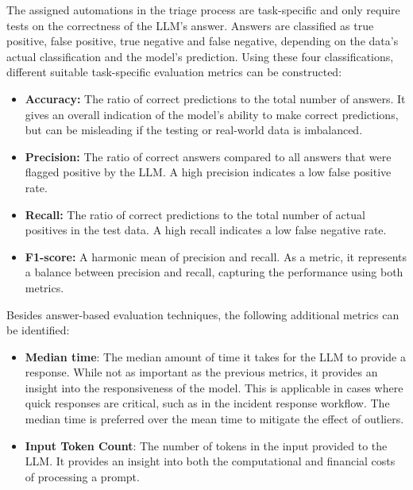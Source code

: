 The assigned automations in the triage process are task-specific and only require tests on the correctness of the LLM's
answer.
Answers are classified as true positive, false positive, true negative and false negative, depending on the data's
actual classification and the model's prediction.
Using these four classifications, different suitable task-specific evaluation metrics can be constructed:
\begin{itemize}
    \item \textbf{Accuracy:} The ratio of correct predictions to the total number of answers.
    It gives an overall indication of the model's ability to make correct predictions, but can be misleading if the
    testing or real-world data is imbalanced.

    \item \textbf{Precision:} The ratio of correct answers compared to all answers that were flagged positive by the
    LLM\@.
    A high precision indicates a low false positive rate.

    \item \textbf{Recall:} The ratio of correct predictions to the total number of actual positives in the test data.
    A high recall indicates a low false negative rate.

    \item \textbf{F1-score:} A harmonic mean of precision and recall.
    As a metric, it represents a balance between precision and recall, capturing the performance using both metrics.
\end{itemize}

Besides answer-based evaluation techniques, the following additional metrics can be identified:
\begin{itemize}
    \item \textbf{Median time}: The median amount of time it takes for the LLM to provide a response.
    While not as important as the previous metrics, it provides an insight into the responsiveness of the model.
    This is applicable in cases where quick responses are critical, such as in the incident response workflow.
    The median time is preferred over the mean time to mitigate the effect of outliers.

    \item \textbf{Input Token Count}: The number of tokens in the input provided to the LLM\@.
    It provides an insight into both the computational and financial costs of processing a prompt.
\end{itemize}

